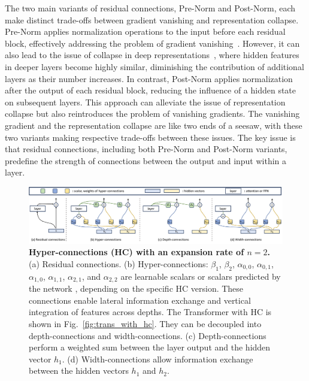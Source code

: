 \documentclass{article} %
\newcommand{\newtext}[1]{\textcolor{red}{#1}}
\renewcommand{\newtext}[1]{#1}
\begin{document}
The two main variants of residual connections, Pre-Norm and Post-Norm, each make distinct trade-offs between gradient vanishing and representation collapse. Pre-Norm applies normalization operations to the input before each residual block, effectively addressing the problem of gradient vanishing~\citep{bengio1994learning,glorot2010understanding}. However, it can also lead to the issue of collapse in deep representations~\citep{liu2020understanding}, where hidden features in deeper layers become highly similar, diminishing the contribution of additional layers as their number increases. 
\newtext{In contrast, Post-Norm applies normalization after the output of each residual block, reducing the influence of a hidden state on subsequent layers.} This approach can alleviate the issue of representation collapse but also reintroduces the problem of vanishing gradients. The vanishing gradient and the representation collapse are like two ends of a seesaw, with these two variants making respective trade-offs between these issues. The key issue is that residual connections, including both Pre-Norm and Post-Norm variants, predefine the strength of connections between the output and input within a layer.

\begin{figure}[t]
    \begin{center}
    \includegraphics[width=1\textwidth]{fig/hc_overview.pdf}
    \end{center}
  \caption{\newtext{{\bf Hyper-connections (HC) with an expansion rate of $n=2$.} (a) Residual connections. (b) Hyper-connections: $\beta_1$, $\beta_2$, $\alpha_{0,0}$, $\alpha_{0,1}$, $\alpha_{1,0}$, $\alpha_{1,1}$, $\alpha_{2,1}$, and $\alpha_{2,2}$ are learnable scalars or scalars predicted by the network , depending on the specific HC version. These connections enable lateral information exchange and vertical integration of features across depths. The Transformer with HC is shown in Fig.~\ref{fig:trans_with_hc}. They can be decoupled into depth-connections and width-connections. (c) Depth-connections perform a weighted sum between the layer output and the hidden vector $h_1$. (d) Width-connections allow information exchange between the hidden vectors $h_1$ and $h_2$.}}
    \label{fig:hc_overview}
\end{figure}
\end{document}
